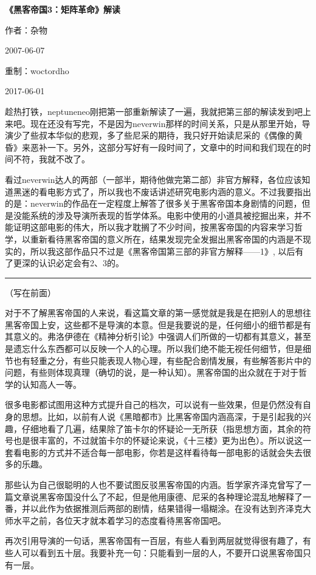 \documentclass[UTF8]{ctexart}
\newcommand{\myparsep}{\noindent \rule[0.5ex]{\linewidth}{1pt}}
\begin{document}
\centerline{\bf \fontsize{15.75pt} \baselineskip \selectfont《黑客帝国3：矩阵革命》解读}
\vspace{12pt}
\centerline{作者：杂物}
\centerline{2007-06-07}
\centerline{重制：woctordho}
\centerline{2017-06-01}
\vspace{12pt}

趁热打铁，neptuneneo刚把第一部重新解读了一遍，我就把第三部的解读发到吧上来吧。现在还没有写完，不是因为neverwin那样的时间关系，只是从那里开始，导演少了些叔本华似的悲观，多了些尼采的期待，我只好开始读尼采的《偶像的黄昏》来恶补一下。另外，这部分写好有一段时间了，文章中的时间和我们现在的时间不符，我就不改了。

看过neverwin达人的两部（一部半，期待他做完第二部）非官方解释，各位应该知道黑迷的看电影方式了，所以我也不废话讲述研究电影内涵的意义。不过我要指出的是：neverwin的作品在一定程度上解答了很多关于黑客帝国本身剧情的问题，但是没能系统的涉及导演所表现的哲学体系。电影中使用的小道具被挖掘出来，并不能证明这部电影的伟大，所以我才耽搁了不少时间，按黑客帝国的内容来学习哲学，以重新看待黑客帝国的意义所在，结果发现完全发掘出黑客帝国的内涵是不现实的，所以我这部作品只不过是《黑客帝国第三部的非官方解释——1》, 以后有了更深的认识必定会有2、3的。

\myparsep

（写在前面）

对于不了解黑客帝国的人来说，看这篇文章的第一感觉就是我是在把别人的思想往黑客帝国上安，这些都不是导演的本意。但是我要说的是，任何细小的细节都是有其意义的。弗洛伊德在《精神分析引论》中强调人们所做的一切都有其意义，甚至是遗忘什么东西都可以反映一个人的心理。所以我们绝不能无视任何细节，但是细节也有轻重之分，有些只能表现人物心理，有些配合剧情发展，有些解答影片中的问题，有些则体现真理（确切的说，是一种认知）。黑客帝国的出众就在于对于哲学的认知高人一等。

很多电影都试图用这种方式提升自己的档次，可以说有一些效果，但是仍然没有自身的思想。比如，以前有人说《黑暗都市》比黑客帝国内涵高深，于是引起我的兴趣，仔细地看了几遍，结果除了笛卡尔的怀疑论一无所获（指思想方面，其余的符号也是很丰富的，不过就笛卡尔的怀疑论来说，《十三楼》更为出色）。所以说这一套看电影的方式并不适合每一部电影，你若是这样看待每一部电影的话就会失去很多的乐趣。

那些认为自己很聪明的人也不要试图反驳黑客帝国的内涵。哲学家齐泽克曾写了一篇文章说黑客帝国没什么了不起，但是他用康德、尼采的各种理论混乱地解释了一番，并以此作为依据推测后两部的剧情，结果错得一塌糊涂。在没有达到齐泽克大师水平之前，各位天才就本着学习的态度看待黑客帝国吧。

再次引用导演的一句话，黑客帝国有一百层，有些人看到两层就觉得很有趣了，有些人可以看到五十层。我要补充一句：只能看到一层的人，不要开口说黑客帝国只有一层。
\end{document}
